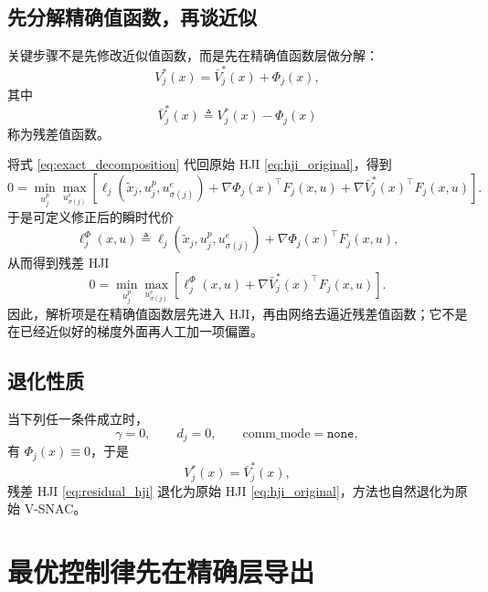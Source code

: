 \documentclass[11pt,a4paper]{article}
\begin{document}
\subsection{先分解精确值函数，再谈近似}

关键步骤不是先修改近似值函数，而是先在精确值函数层做分解：
\begin{equation}
V_j^*(x)=\bar V_j^*(x)+\Phi_j(x),
\label{eq:exact_decomposition}
\end{equation}
其中
\begin{equation}
\bar V_j^*(x)\triangleq V_j^*(x)-\Phi_j(x)
\end{equation}
称为残差值函数。

将式 \eqref{eq:exact_decomposition} 代回原始 HJI \eqref{eq:hji_original}，得到
\begin{equation}
0=
\min_{u_j^p}\max_{u_{\sigma(j)}^e}
\left[
\ell_j(\tilde x_j,u_j^p,u_{\sigma(j)}^e)
+
\nabla\Phi_j(x)^\top F_j(x,u)
+
\nabla\bar V_j^*(x)^\top F_j(x,u)
\right].
\label{eq:hji_with_phi}
\end{equation}
于是可定义修正后的瞬时代价
\begin{equation}
\ell_j^\Phi(x,u)
\triangleq
\ell_j(\tilde x_j,u_j^p,u_{\sigma(j)}^e)
+
\nabla\Phi_j(x)^\top F_j(x,u),
\label{eq:shaped_stage_cost}
\end{equation}
从而得到残差 HJI
\begin{equation}
0=
\min_{u_j^p}\max_{u_{\sigma(j)}^e}
\left[
\ell_j^\Phi(x,u)
+
\nabla\bar V_j^*(x)^\top F_j(x,u)
\right].
\label{eq:residual_hji}
\end{equation}
因此，解析项是在精确值函数层先进入 HJI，再由网络去逼近残差值函数；它不是在已经近似好的梯度外面再人工加一项偏置。

\subsection{退化性质}

当下列任一条件成立时，
\begin{equation}
\gamma=0,
\qquad
d_j=0,
\qquad
\text{comm\_mode}=\texttt{none},
\end{equation}
有 $\Phi_j(x)\equiv 0$，于是
\begin{equation}
V_j^*(x)=\bar V_j^*(x),
\end{equation}
残差 HJI \eqref{eq:residual_hji} 退化为原始 HJI \eqref{eq:hji_original}，方法也自然退化为原始 V-SNAC。

\section{最优控制律先在精确层导出}
\end{document}
